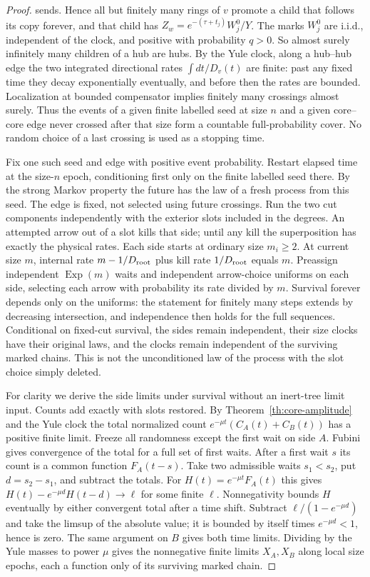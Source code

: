 \documentclass[11pt]{article}
\theoremstyle{remark}
\numberwithin{equation}{section}
\begin{document}
\begin{proof}
sends. Hence all but finitely many rings of $v$ promote a child that follows its copy forever, and that child has $Z_w=e^{-(\tau+t_j)}W^0_j/Y$. The marks $W^0_j$ are i.i.d., independent of the clock, and positive with probability $q>0$. So almost surely infinitely many children of a hub are hubs. By the Yule clock, along a hub--hub edge the two integrated directional rates $\int dt/D_v(t)$ are finite: past any fixed time they decay exponentially eventually, and before then the rates are bounded. Localization at bounded compensator implies finitely many crossings almost surely. Thus the events of a given finite labelled seed at size $n$ and a given core--core edge never crossed after that size form a countable full-probability cover. No random choice of a last crossing is used as a stopping time.

Fix one such seed and edge with positive event probability. Restart elapsed time at the size-$n$ epoch, conditioning first only on the finite labelled seed there. By the strong Markov property the future has the law of a fresh process from this seed. The edge is fixed, not selected using future crossings. Run the two cut components independently with the exterior slots included in the degrees. An attempted arrow out of a slot kills that side; until any kill the superposition has exactly the physical rates. Each side starts at ordinary size $m_i\ge2$. At current size $m$, internal rate $m-1/D_{\rm root}$ plus kill rate $1/D_{\rm root}$ equals $m$. Preassign independent $\operatorname{Exp}(m)$ waits and independent arrow-choice uniforms on each side, selecting each arrow with probability its rate divided by $m$. Survival forever depends only on the uniforms: the statement for finitely many steps extends by decreasing intersection, and independence then holds for the full sequences. Conditional on fixed-cut survival, the sides remain independent, their size clocks have their original laws, and the clocks remain independent of the surviving marked chains. This is not the unconditioned law of the process with the slot choice simply deleted.

For clarity we derive the side limits under survival without an inert-tree limit input. Counts add exactly with slots restored. By Theorem~\ref{th:core-amplitude} and the Yule clock the total normalized count $e^{-\mu t}(C_A(t)+C_B(t))$ has a positive finite limit. Freeze all randomness except the first wait on side $A$. Fubini gives convergence of the total for a full set of first waits. After a first wait $s$ its count is a common function $F_A(t-s)$. Take two admissible waits $s_1<s_2$, put $d=s_2-s_1$, and subtract the totals. For $H(t)=e^{-\mu t}F_A(t)$ this gives $H(t)-e^{-\mu d}H(t-d)\to\ell$ for some finite $\ell$. Nonnegativity bounds $H$ eventually by either convergent total after a time shift. Subtract $\ell/(1-e^{-\mu d})$ and take the limsup of the absolute value; it is bounded by itself times $e^{-\mu d}<1$, hence is zero. The same argument on $B$ gives both time limits. Dividing by the Yule masses to power $\mu$ gives the nonnegative finite limits $X_A,X_B$ along local size epochs, each a function only of its surviving marked chain.


\end{proof}
\end{document}
